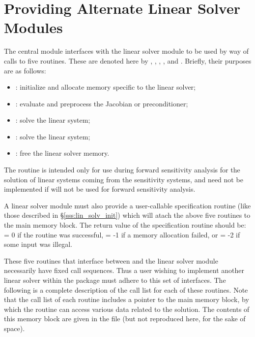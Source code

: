 \section{Providing Alternate Linear Solver Modules}\label{s:new_linsolv}
The central {\cvodes} module interfaces with the linear solver module to be
used by way of calls to five routines.  These are denoted here by 
, , , , and .
Briefly, their purposes are as follows:
\begin{itemize}
\item {}: initialize and allocate memory specific to the
linear solver;
\item {}: evaluate and preprocess the Jacobian or preconditioner;
\item {}: solve the linear system;
\item {}: solve the linear system;
\item {}: free the linear solver memory.
\end{itemize}
The  routine is intended only for use during forward sensitivity
analysis for the solution of linear systems coming from the sensitivity
systems, and need not be implemented if {\cvodes} will not be used for 
forward sensitivity analysis.

A linear solver module must also provide a user-callable specification routine
(like those described in \S\ref{sss:lin_solv_init}) which will atach the above five 
routines to the main {\cvodes} memory block. The return value of the specification 
routine should be:  = 0 if the routine was successful,
 = -1 if a memory allocation failed, or  = -2
if some input was illegal.

These five routines that interface between {\cvodes} and the linear solver module
necessarily have fixed call sequences.  Thus a user wishing to implement another 
linear solver within the {\cvodes} package must adhere to this set of interfaces.
The following is a complete description of the call list for each of
these routines.  Note that the call list of each routine includes a
pointer to the main {\cvodes} memory block, by which the routine can access
various data related to the {\cvodes} solution.  The contents of this memory
block are given in the file  (but not reproduced here, for
the sake of space).

